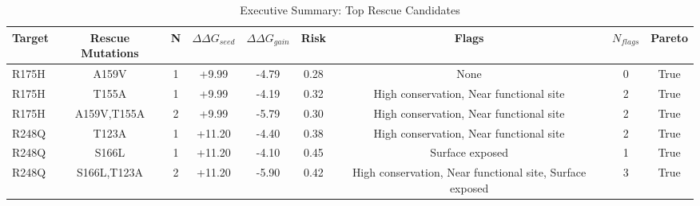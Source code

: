 \documentclass{article}
\begin{document}
\begin{table}[htbp]
\centering
\caption{Executive Summary: Top Rescue Candidates}
\label{tab:executive_summary}
\begin{tabular}{lcccccccc}
\toprule
Target & Rescue Mutations & N & $\Delta\Delta G_{seed}$ & $\Delta\Delta G_{gain}$ & Risk & Flags & $N_{flags}$ & Pareto \\
\midrule
R175H & A159V & 1 & +9.99 & -4.79 & 0.28 & None & 0 & True \\
R175H & T155A & 1 & +9.99 & -4.19 & 0.32 & High conservation, Near functional site & 2 & True \\
R175H & A159V,T155A & 2 & +9.99 & -5.79 & 0.30 & High conservation, Near functional site & 2 & True \\
R248Q & T123A & 1 & +11.20 & -4.40 & 0.38 & High conservation, Near functional site & 2 & True \\
R248Q & S166L & 1 & +11.20 & -4.10 & 0.45 & Surface exposed & 1 & True \\
R248Q & S166L,T123A & 2 & +11.20 & -5.90 & 0.42 & High conservation, Near functional site, Surface exposed & 3 & True \\
\bottomrule
\end{tabular}
\end{table}
\end{document}
